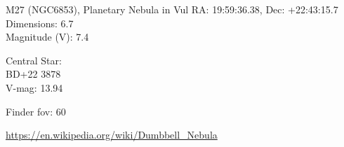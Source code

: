 \begin{block}{M27 (NGC6853), Planetary Nebula in Vul}
    RA: 19:59:36.38, Dec: +22:43:15.7 \\ 
    Dimensions: 6.7 \\ 
    Magnitude (V): 7.4


    Central Star: \\ 
      \hspace{1em}BD+22 3878 \\ 
      \hspace{1em}V-mag: 13.94 


    Finder fov: 60 

    \url{https://en.wikipedia.org/wiki/Dumbbell_Nebula} 
\end{block}